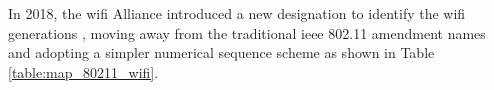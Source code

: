 In 2018, the \gls{wifi} Alliance introduced a new designation to identify the \gls{wifi} generations \cite{wifi6_introduction}, moving away from the traditional \gls{ieee} 802.11 amendment names and adopting a simpler numerical sequence scheme as shown in Table \ref{table:map_80211_wifi}.

\FloatBarrier
